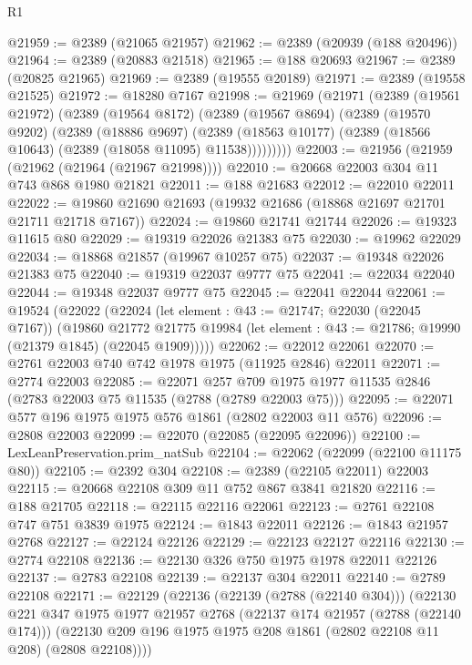 \begin{lexlean}{R1}
\begin{coremodule}
@21959 := @2389 (@21065 @21957)
@21962 := @2389 (@20939 (@188 @20496))
@21964 := @2389 (@20883 @21518)
@21965 := @188 @20693
@21967 := @2389 (@20825 @21965)
@21969 := @2389 (@19555 @20189)
@21971 := @2389 (@19558 @21525)
@21972 := @18280 @7167
@21998 := @21969
    (@21971
      (@2389
        (@19561 @21972)
        (@2389
          (@19564 @8172)
          (@2389
            (@19567 @8694)
            (@2389
              (@19570 @9202)
              (@2389
                (@18886 @9697)
                (@2389 (@18563 @10177) (@2389 (@18566 @10643) (@2389 (@18058 @11095) @11538)))))))))
@22003 := @21956 (@21959 (@21962 (@21964 (@21967 @21998))))
@22010 := @20668 @22003 @304 @11 @743 @868 @1980 @21821
@22011 := @188 @21683
@22012 := @22010 @22011
@22022 := @19860 @21690 @21693 (@19932 @21686 (@18868 @21697 @21701 @21711 @21718 @7167))
@22024 := @19860 @21741 @21744
@22026 := @19323 @11615 @80
@22029 := @19319 @22026 @21383 @75
@22030 := @19962 @22029
@22034 := @18868 @21857 (@19967 @10257 @75)
@22037 := @19348 @22026 @21383 @75
@22040 := @19319 @22037 @9777 @75
@22041 := @22034 @22040
@22044 := @19348 @22037 @9777 @75
@22045 := @22041 @22044
@22061 := @19524
    (@22022
      (@22024
        (let element : @43 := @21747; @22030 (@22045 @7167))
        (@19860
          @21772
          @21775
          @19984
          (let element : @43 := @21786; @19990 (@21379 @1845) (@22045 @1909)))))
@22062 := @22012 @22061
@22070 := @2761 @22003 @740 @742 @1978 @1975 (@11925 @2846) @22011
@22071 := @2774 @22003
@22085 := @22071
    @257
    @709
    @1975
    @1977
    @11535
    @2846
    (@2783 @22003 @75 @11535 (@2788 (@2789 @22003 @75)))
@22095 := @22071 @577 @196 @1975 @1975 @576 @1861 (@2802 @22003 @11 @576)
@22096 := @2808 @22003
@22099 := @22070 (@22085 (@22095 @22096))
@22100 := LexLeanPreservation.prim_natSub
@22104 := @22062 (@22099 (@22100 @11175 @80))
@22105 := @2392 @304
@22108 := @2389 (@22105 @22011) @22003
@22115 := @20668 @22108 @309 @11 @752 @867 @3841 @21820
@22116 := @188 @21705
@22118 := @22115 @22116 @22061
@22123 := @2761 @22108 @747 @751 @3839 @1975
@22124 := @1843 @22011
@22126 := @1843 @21957 @2768
@22127 := @22124 @22126
@22129 := @22123 @22127 @22116
@22130 := @2774 @22108
@22136 := @22130 @326 @750 @1975 @1978 @22011 @22126
@22137 := @2783 @22108
@22139 := @22137 @304 @22011
@22140 := @2789 @22108
@22171 := @22129
    (@22136
      (@22139 (@2788 (@22140 @304)))
      (@22130
        @221
        @347
        @1975
        @1977
        @21957
        @2768
        (@22137 @174 @21957 (@2788 (@22140 @174)))
        (@22130 @209 @196 @1975 @1975 @208 @1861 (@2802 @22108 @11 @208) (@2808 @22108))))

\end{coremodule}
\end{lexlean}
